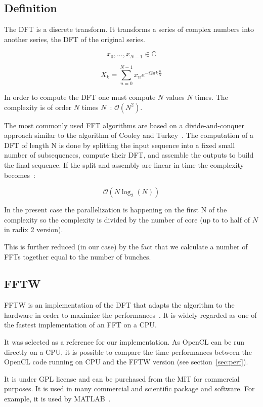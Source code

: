 \subsection{Definition}

The \gls{DFT} is a discrete transform. It transforms a series of complex numbers into another series, the \gls{DFT} of the original series.

$$ x_0,...,x_{N -1} \in \mathbb{C} $$

$$ X_{k} = \displaystyle\sum\limits_{n = 0}^{N -1} x_{n}e^{-i 2 \pi k \frac{n}{N}} $$

In order to compute the \gls{DFT} one must compute $N$ values $N$ times. The complexity is of order $N$ times $N$~: $ \mathcal{O}(N^{2}) $.

The most commonly used \gls{FFT} algorithms are based on a divide-and-conquer approach similar to the algorithm of Cooley and Turkey~\cite{Cooley65}. The computation of a \gls{DFT} of length N is done by splitting the input sequence into a fixed small number of subsequences, compute their \gls{DFT}, and assemble the outputs to build the final sequence. If the split and assembly are linear in time the complexity becomes~:

$$ \mathcal{O}(N \log_{2}(N)) $$

In the present case the parallelization is happening on the first N of the complexity so the complexity is divided by the number of core (up to to half of $N$ in radix 2 version). 

This is further reduced (in our case) by the fact that we calculate a number of \glspl{FFT} together equal to the number of bunches.

\subsection{FFTW}

\Gls{FFTW} is an implementation of the \gls{DFT} that adapts the algorithm to the hardware in order to maximize the performances~\cite{fftw05}. It is widely regarded as one of the fastest implementation of an \gls{FFT} on a \gls{CPU}.

It was selected as a reference for our implementation. As \gls{OpenCL} can be run directly on a \gls{CPU}, it is possible to compare the time performances between the \gls{OpenCL} code running on \gls{CPU} and the \gls{FFTW} version (see section~\ref{sec:perf}).

It is under GPL license and can be purchased from the \gls{MIT} for commercial purposes. It is used in many commercial and scientific package and software. For example, it is used by MATLAB~\cite{matlab_fftw}.

